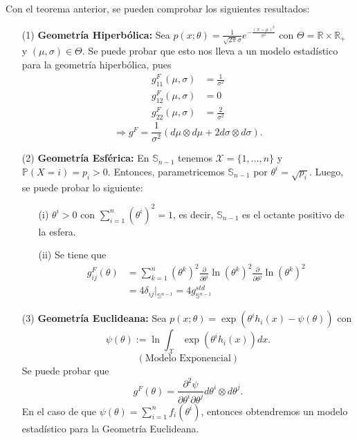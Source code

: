 \begin{example}
Con el teorema anterior, se pueden comprobar los siguientes resultados:
\begin{enumerate}
    \item[(1)] \textbf{Geometr\'ia Hiperb\'olica:} Sea $p(x;\theta)=\frac{1}{\sqrt{2\pi}\sigma}e^{-\frac{(x-\mu)^2}{\sigma^2}}$ con $\Theta=\mathbb{R}\times\mathbb{R}_+$ y $(\mu,\sigma)\in\Theta$. Se puede probar que esto nos lleva a un modelo estad\'istico para la geometr\'ia hiperb\'olica, pues
    \begin{align*}
    g_{11}^F(\mu,\sigma)&=\frac{1}{\sigma^2}\\
    g_{12}^F(\mu,\sigma)&=0\\
    g_{22}^F(\mu,\sigma)&=\frac{2}{\sigma^2}
    \end{align*}
    \begin{equation*}
        \Longrightarrow g^F=\frac{1}{\sigma^2}(d\mu\otimes d\mu+2d\sigma\otimes d\sigma).
    \end{equation*}
    \item[(2)] \textbf{Geometr\'ia Esf\'erica:} En $\mathbb{S}_{n-1}$ tenemos $\mathcal{X}=\{1,\dots,n\}$ y $\mathbb{P}(X=i)=p_i>0$. 
    Entonces, parametricemos $\mathbb{S}_{n-1}$ por $\theta^i=\sqrt{p_i}$. Luego, se puede probar lo siguiente:
    \begin{enumerate}
        \item[(i)] $\theta^i>0$ con $\sum_{i=1}^{n}(\theta^i)^2=1$,  %
%          
        es decir, $\mathbb{S}_{n-1}$ es el octante positivo de la esfera. 
        \item[(ii)] Se tiene que 
        \begin{align*}
            g_{ij}^F(\theta)&=\sum_{k=1}^{n}(\theta^k)^2\frac{\partial}{\partial\theta^i}\ln(\theta^k)^2\frac{\partial}{\partial\theta^j}\ln(\theta^k)^2\\
            &=4\delta_{ij}\big|_{\mathbb{S}^{n-1}}=4g_{\mathbb{S}^{n-1}}^{std}
        \end{align*}
    \end{enumerate}
    \item[(3)] \textbf{Geometr\'ia Euclideana:} Sea $p(x;\theta)=\exp(\theta^ih_i(x)-\psi(\theta))$ con
    \begin{equation*}
        \psi(\theta):=\ln\int_{\mathcal{X}}\exp(\theta^ih_i(x))dx.
    \end{equation*}
    \begin{equation*}
        (\text{Modelo Exponencial})
    \end{equation*}
    Se puede probar que 
    \begin{equation*}
        g^F(\theta)=\frac{\partial^2\psi}{\partial\theta^i\partial\theta^j}d\theta^i\otimes d\theta^j.
    \end{equation*}
    En el caso de que $\psi(\theta)=\sum_{i=1}^{n}f_i(\theta^i)$, entonces obtendremos un modelo estad\'istico para la Geometr\'ia Euclideana. 
\end{enumerate}

\end{example}

